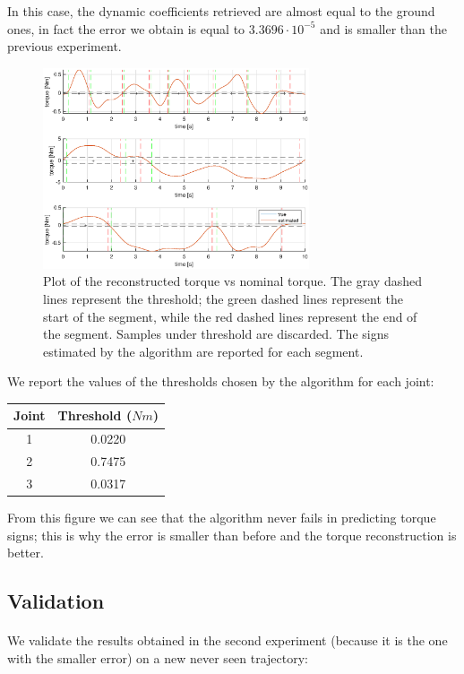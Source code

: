 \documentclass{article}
\begin{document}
In this case, the dynamic coefficients retrieved are almost equal to the ground ones, in fact the error we obtain is equal to   $3.3696\cdot10^{-5}$ and is smaller than the previous experiment.

\begin{figure}[!htbp]
\centering
\includegraphics[width=0.7\textwidth]{images/3-dof/results2.eps}
\caption{Plot of the reconstructed torque vs nominal torque. The gray dashed lines represent the threshold; the green dashed lines represent the start of the segment, while the red dashed lines represent the end of the segment. Samples under threshold are discarded. The signs estimated by the algorithm are reported for each segment.}
\end{figure}
\FloatBarrier

We report the values of the thresholds chosen by the algorithm for each joint:

\begin{table}[!htbp]
\centering
\begin{tabular}{|c|c|}
\hline
Joint & Threshold ($Nm$)\\ 
\hline
1 & 0.0220\\
2 & 0.7475\\
3 & 0.0317\\
\hline
\end{tabular}
\end{table}
\FloatBarrier

From this figure we can see that the algorithm never fails in predicting torque signs; this is why the error is smaller than before and the torque reconstruction is better.

\subsection{Validation} \paragraph{} We validate the results obtained in the second experiment (because it is the one with the smaller error) on a new never seen trajectory:
\end{document}
